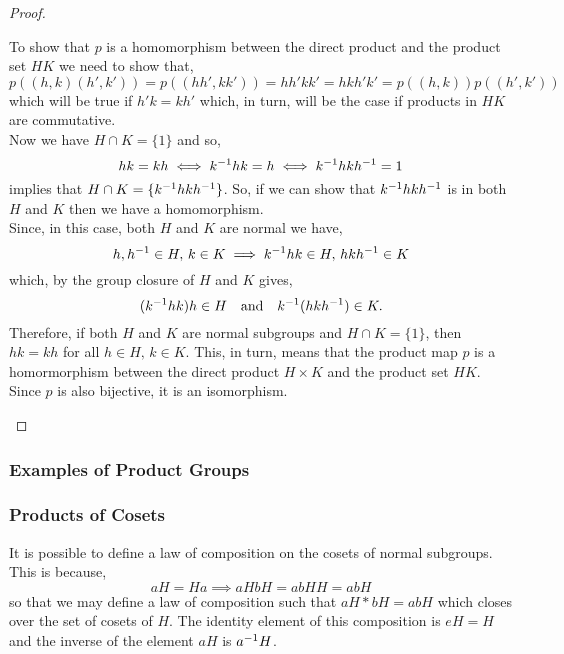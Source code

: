 \documentclass[MathsNotesBase.tex]{subfiles}
\begin{document}
{\begin{proof}
\begin{enumerate}[label=(\roman*)]
{				To show that $p$ is a homomorphism between the direct product and the product set $HK$ we need to show that,
				\[ p((h,k)(h',k')) = p((hh', kk')) = hh'kk' = hkh'k' = p((h,k))p((h',k')) \]
				which will be true if ${ h'k = kh' }$ which, in turn, will be the case if products in $HK$ are commutative.\\
				Now we have ${ H \cap K = \{1\} }$ and so,
				\[ hk = kh \iff {k}^{-1}hk = h \iff {k}^{-1}hk{h}^{-1} = 1 \]
				implies that ${ H \cap K = \{{k}^{-1}hk{h}^{-1}\} }$. So, if we can show that ${ {k}^{-1}hk{h}^{-1} }$ is in both $H$ and $K$ then we have a homomorphism.\\
				Since, in this case, both $H$ and $K$ are normal we have,
				\[ h,{h}^{-1} \in H,\, k \in K \implies {k}^{-1}hk \in H,\, hk{h}^{-1} \in K \]
				which, by the group closure of $H$ and $K$ gives,
				\[ ({k}^{-1}hk)h \in H \hspace{10pt}\text{and}\hspace{10pt} {k}^{-1}(hk{h}^{-1}) \in K. \]
				Therefore, if both $H$ and $K$ are normal subgroups and ${ H \cap K = \{1\} }$, then ${ hk = kh }$ for all ${ h \in H,\, k \in K }$. This, in turn, means that the product map $p$ is a homormorphism between the direct product ${ H \times K }$ and the product set $HK$. Since $p$ is also bijective, it is an isomorphism. 
			}
		\end{enumerate}
	\end{proof}

	\subsubsection{Examples of Product Groups}
	\begin{exe}
	\end{exe}

	\bigskip
	\subsubsection{Products of Cosets}
	It is possible to define a law of composition on the cosets of normal subgroups. This is because,
	\[ aH = Ha \implies aHbH = abHH = abH \]
	so that we may define a law of composition such that ${ aH * bH = abH }$ which closes over the set of cosets of $H$. The identity element of this composition is ${ eH = H }$ and the inverse of the element $aH$ is ${ {a}^{-1}H }$.
	
}
\end{document}
